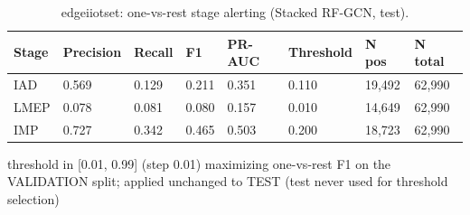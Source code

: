 \begin{table}[t]
\centering
\caption{edgeiiotset: one-vs-rest stage alerting (Stacked RF-GCN, test).}
\label{tab:edgeiiotset_ovr_alerting}
\begin{tabular}{llllllll}
\toprule
Stage & Precision & Recall & F1 & PR-AUC & Threshold & N pos & N total \\
\midrule
IAD & 0.569 & 0.129 & 0.211 & 0.351 & 0.110 & 19,492 & 62,990 \\
LMEP & 0.078 & 0.081 & 0.080 & 0.157 & 0.010 & 14,649 & 62,990 \\
IMP & 0.727 & 0.342 & 0.465 & 0.503 & 0.200 & 18,723 & 62,990 \\
\bottomrule
\end{tabular}
\vspace{2pt}
\parbox{\linewidth}{\footnotesize threshold in [0.01, 0.99] (step 0.01) maximizing one-vs-rest F1 on the VALIDATION split; applied unchanged to TEST (test never used for threshold selection)}
\end{table}
